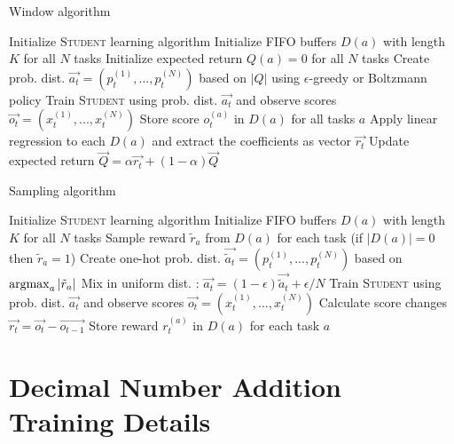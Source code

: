 \begin{appendices}
\begin{algorithm}
\caption{Window algorithm}\label{online_window}
\begin{algorithmic}
\State Initialize \textsc{Student} learning algorithm
\State Initialize FIFO buffers $D(a)$ with length $K$ for all $N$ tasks
\State Initialize expected return $Q(a)=0$ for all $N$ tasks
\State Create prob. dist. $\vec{a_t}=(p_t^{(1)}, ..., p_t^{(N)})$ based on $|Q|$ using $\epsilon$-greedy or Boltzmann policy
\State Train \textsc{Student} using prob. dist. $\vec{a_t}$ and observe scores $\vec{o_t} = (x_t^{(1)}, ..., x_t^{(N)})$
\State Store score $o_t^{(a)}$ in $D(a)$ for all tasks $a$
\State Apply linear regression to each $D(a)$ and extract the coefficients as vector $\vec{r_t}$
\State Update expected return $\vec{Q} = \alpha \vec{r_t} + (1 - \alpha) \vec{Q}$
\EndFor
\end{algorithmic}
\end{algorithm}

\begin{algorithm}
\caption{Sampling algorithm}\label{online_sampling}
\begin{algorithmic}
\State Initialize \textsc{Student} learning algorithm
\State Initialize FIFO buffers $D(a)$ with length $K$ for all $N$ tasks
\State Sample reward $\tilde{r}_a$ from $D(a)$ for each task (if $|D(a)|=0$ then $\tilde{r}_a=1$)
\State Create one-hot prob. dist. $\vec{\tilde{a}_t}=(p_t^{(1)}, ..., p_t^{(N)})$ based on $\operatorname{argmax}\nolimits_a |\tilde{r}_a|$
\State Mix in uniform dist. : $\vec{a_t} = (1 - \epsilon) \vec{\tilde{a}_t} + \epsilon/N$
\State Train \textsc{Student} using prob. dist. $\vec{a_t}$ and observe scores $\vec{o_t} = (x_t^{(1)}, ..., x_t^{(N)})$
\State Calculate score changes $\vec{r_t} = \vec{o_t} - \vec{o_{t-1}}$
\State Store reward $r_t^{(a)}$ in $D(a)$ for each task $a$
\EndFor
\end{algorithmic}
\end{algorithm}

\clearpage
\section{Decimal Number Addition Training Details}
\label{appendix:addition}


\end{appendices}

